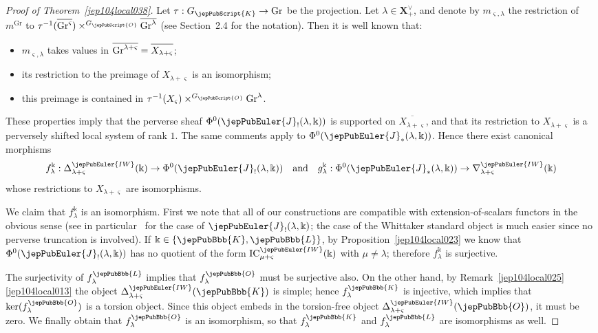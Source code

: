 \begin{proof}[Proof of Theorem~{\rm \ref{jep104local038}}]
Let $\tau : G_{\jepPubScript{K}} \to \mathrm{Gr}$ be the projection. Let $\lambda \in \boldsymbol{X}^\vee_+$, and denote by $m_{\varsigma,\lambda}$ the restriction of $m^{\mathrm{Gr}}$ to $\tau^{-1}(\overline{\strut \mathrm{Gr}^\varsigma}) \times^{G_{\jepPubScript{O}}} \overline{\mathrm{Gr}^\lambda}$ (see Section~2.4 for the notation). Then it is well known that:
\begin{itemize}
\item
$m_{\varsigma,\lambda}$ takes values in $\overline{\mathrm{Gr}^{\lambda+\varsigma}} = \overline{\strut X_{\lambda+\varsigma}}$;
\item
its restriction to the preimage of $X_{\lambda+\varsigma}$ is an isomorphism;
\item
this preimage is contained in $\tau^{-1}(X_\varsigma) \times^{G_{\jepPubScript{O}}} \mathrm{Gr}^\lambda$.
\end{itemize}

These properties imply
that the perverse sheaf $\Phi^0(\jepPubEuler{J}_!(\lambda,\Bbbk))$ is supported on $\overline{X_{\lambda+\varsigma}}$, and that its restriction to $X_{\lambda+\varsigma}$ is a perversely shifted local system of rank $1$. The same comments apply to $\Phi^0(\jepPubEuler{J}_*(\lambda,\Bbbk))$.
Hence there exist canonical morphisms
\[
f^\Bbbk_\lambda : \Delta^{\jepPubEuler{IW}}_{\lambda + \varsigma}(\Bbbk) \to \Phi^0(\jepPubEuler{J}_!(\lambda,\Bbbk)) \quad \text{and} \quad g_\lambda^\Bbbk : \Phi^0(\jepPubEuler{J}_*(\lambda,\Bbbk)) \to \nabla^{\jepPubEuler{IW}}_{\lambda + \varsigma}(\Bbbk)
\]
whose restrictions to $X_{\lambda+\varsigma}$ are isomorphisms.

We claim that $f_\lambda^\Bbbk$ is an isomorphism.
First we note that all of our constructions are compatible with extension-of-scalars functors in the obvious sense (see in particular~\cite[Prop.~8.1]{jep104ref36} for the case of $\jepPubEuler{J}_!(\lambda,\Bbbk)$; the case of the Whittaker standard object is much easier since no perverse truncation is involved). If $\Bbbk \in \{\jepPubBbb{K},\jepPubBbb{L}\}$, by Proposition~\ref{jep104local023} we know that $\Phi^0(\jepPubEuler{J}_!(\lambda,\Bbbk))$ has no quotient of the form $\mathrm{IC}^{\jepPubEuler{IW}}_{\mu+\varsigma}(\Bbbk)$ with $\mu \neq \lambda$; therefore $f_\lambda^\Bbbk$ is surjective. 

The surjectivity of $f_\lambda^{\jepPubBbb{L}}$ implies that $f_\lambda^{\jepPubBbb{O}}$ must be surjective also. On the other hand, by Remark~\ref{jep104local025}\eqref{jep104local013} the object $\Delta^{\jepPubEuler{IW}}_{\lambda + \varsigma}(\jepPubBbb{K})$ is simple; hence $f_\lambda^{\jepPubBbb{K}}$ is injective, which implies that $\ker(f_\lambda^{\jepPubBbb{O}})$ is a torsion object. Since this object embeds in the torsion-free object $\Delta^{\jepPubEuler{IW}}_{\lambda + \varsigma}(\jepPubBbb{O})$, it must be zero. We finally obtain that $f_\lambda^{\jepPubBbb{O}}$ is an isomorphism, so that $f_\lambda^{\jepPubBbb{K}}$ and $f_\lambda^{\jepPubBbb{L}}$ are isomorphisms as well.


\end{proof}
